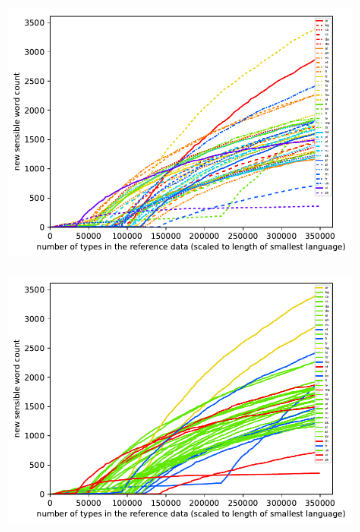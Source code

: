 \documentclass[11pt,a4paper,twoside,openright]{scrbook}
\begin{document}
\begin{figure}[h]
    \centering
    \begin{subfigure}[b]{0.32\textwidth}
    	\centering
        \includegraphics[width=\textwidth]{graphs/lstm/norm_huge_type_type_performance}
    \end{subfigure}
    \begin{subfigure}[b]{0.32\textwidth}
    	\centering
        \includegraphics[width=\textwidth]{graphs/lstm/morph_types/norm_huge_type_type_performance}
    \end{subfigure}
    \begin{subfigure}[b]{0.32\textwidth}
    	\centering

\end{subfigure}
\end{figure}
\end{document}
